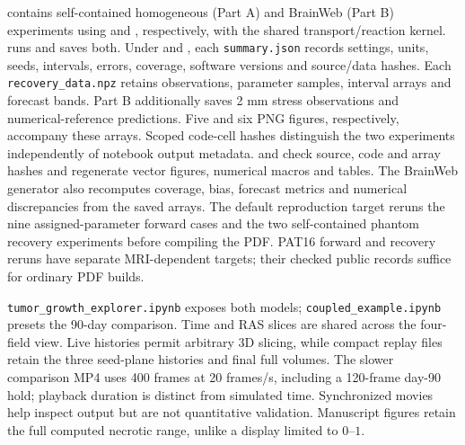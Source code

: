 contains self-contained homogeneous (Part A) and BrainWeb (Part B) experiments using  and , respectively, with the shared transport/reaction kernel.  runs and saves both. Under  and , each \texttt{summary.json} records settings, units, seeds, intervals, errors, coverage, software versions and source/data hashes. Each \texttt{recovery\_data.npz} retains observations, parameter samples, interval arrays and forecast bands. Part B additionally saves 2 mm stress observations and numerical-reference predictions. Five and six PNG figures, respectively, accompany these arrays. Scoped code-cell hashes distinguish the two experiments independently of notebook output metadata.  and  check source, code and array hashes and regenerate vector figures, numerical macros and tables. The BrainWeb generator also recomputes coverage, bias, forecast metrics and numerical discrepancies from the saved arrays. The default reproduction target reruns the nine assigned-parameter forward cases and the two self-contained phantom recovery experiments before compiling the PDF. PAT16 forward and recovery reruns have separate MRI-dependent targets; their checked public records suffice for ordinary PDF builds.

\texttt{tumor\_growth\_explorer.ipynb} exposes both models; \texttt{coupled\_example.ipynb} presets the 90-day comparison. Time and RAS slices are shared across the four-field view. Live histories permit arbitrary 3D slicing, while compact replay files retain the three seed-plane histories and final full volumes. The slower comparison MP4 uses 400 frames at 20 frames/s, including a 120-frame day-90 hold; playback duration is distinct from simulated time. Synchronized movies help inspect output but are not quantitative validation. Manuscript figures retain the full computed necrotic range, unlike a display limited to $0$--$1$.




